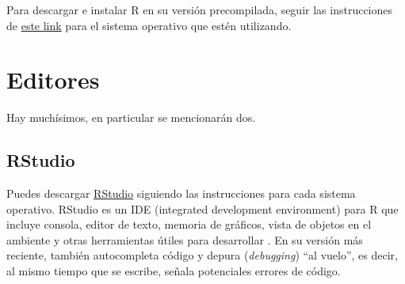 \documentclass[]{article}
\newenvironment{Shaded}{\begin{snugshade}}{\end{snugshade}}
\newcommand{\KeywordTok}[1]{\textcolor[rgb]{0.13,0.29,0.53}{\textbf{#1}}}
\newcommand{\StringTok}[1]{\textcolor[rgb]{0.31,0.60,0.02}{#1}}
\newcommand{\FunctionTok}[1]{\textcolor[rgb]{0.00,0.00,0.00}{#1}}
\newcommand{\VariableTok}[1]{\textcolor[rgb]{0.00,0.00,0.00}{#1}}
\newcommand{\OperatorTok}[1]{\textcolor[rgb]{0.81,0.36,0.00}{\textbf{#1}}}
\newcommand{\BuiltInTok}[1]{#1}
\newcommand{\ExtensionTok}[1]{#1}
\newcommand{\NormalTok}[1]{#1}
\begin{document}
\begin{Shaded}
\end{Shaded}

Para descargar e instalar R en su versión precompilada, seguir las
instrucciones de \href{https://cran.r-project.org/}{este link} para el
sistema operativo que estén utilizando.

\section{Editores}\label{editores}

Hay muchísimos, en particular se mencionarán dos.

\subsection{RStudio}\label{rstudio}

Puedes descargar
\href{https://www.rstudio.com/products/rstudio/download/}{RStudio}
siguiendo las instrucciones para cada sistema operativo. RStudio es un
IDE (integrated development environment) para R que incluye consola,
editor de texto, memoria de gráficos, vista de objetos en el ambiente y
otras herramientas útiles para desarrollar \parencite{rstudio}. En su
versión más reciente, también autocompleta código y depura
(\emph{debugging}) ``al vuelo'', es decir, al mismo tiempo que se
escribe, señala potenciales errores de código.
\end{document}
